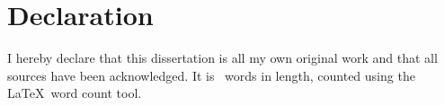 \chapter*{Declaration}

I hereby declare that this dissertation is all my own original work and that
all sources have been acknowledged. It is \wordcount\ words in length, counted using the \LaTeX\ word count tool.

\vspace{2cm}

\noindent\authorname

\noindent\submissiondate

\newpage
